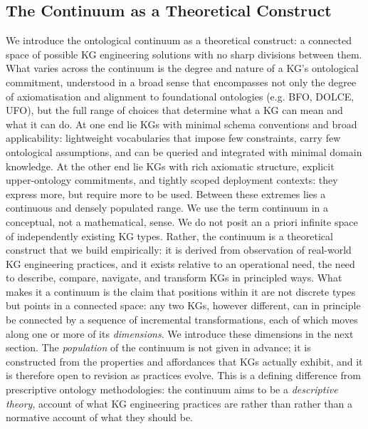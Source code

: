 \documentclass[runningheads]{llncs}
\newenvironment{onlyextended}{\ignorespaces}{\ignorespacesafterend}
\begin{document}
\begin{onlyextended}
\subsection{The Continuum as a Theoretical Construct}
We introduce the ontological continuum as a theoretical construct: a connected space of possible KG engineering solutions with no sharp divisions between them. 
What varies across the continuum is the degree and nature of a KG's ontological commitment, understood in a broad sense that encompasses not only the degree of axiomatisation and alignment to foundational ontologies (e.g. BFO, DOLCE, UFO), but the full range of choices that determine what a KG can mean and what it can do. 
At one end lie KGs with minimal schema conventions and broad applicability: lightweight vocabularies that impose few constraints, carry few ontological assumptions, and can be queried and integrated with minimal domain knowledge. 
At the other end lie KGs with rich axiomatic structure, explicit upper-ontology commitments, and tightly scoped deployment contexts: they express more, but require more to be used. 
Between these extremes lies a continuous and densely populated range.
We use the term continuum in a conceptual, not a mathematical, sense. We do not posit an a priori infinite space of independently existing KG types. 
Rather, the continuum is a theoretical construct that we build empirically: it is derived from observation of real-world KG engineering practices, and it exists relative to an operational need, the need to describe, compare, navigate, and transform KGs in principled ways. 
What makes it a continuum is the claim that positions within it are not discrete types but points in a connected space: any two KGs, however different, can in principle be connected by a sequence of incremental transformations, each of which moves along one or more of its \textit{dimensions}. 
We introduce these dimensions in the next section.
The \textit{population} of the continuum is not given in advance; it is constructed from the properties and affordances that KGs actually exhibit, and it is therefore open to revision as practices evolve. 
This is a defining difference from prescriptive ontology methodologies: the continuum aims to be a \emph{descriptive theory}, account of what KG engineering practices are rather than rather than a normative account of what they should be.
\end{onlyextended}
% 
\end{document}
